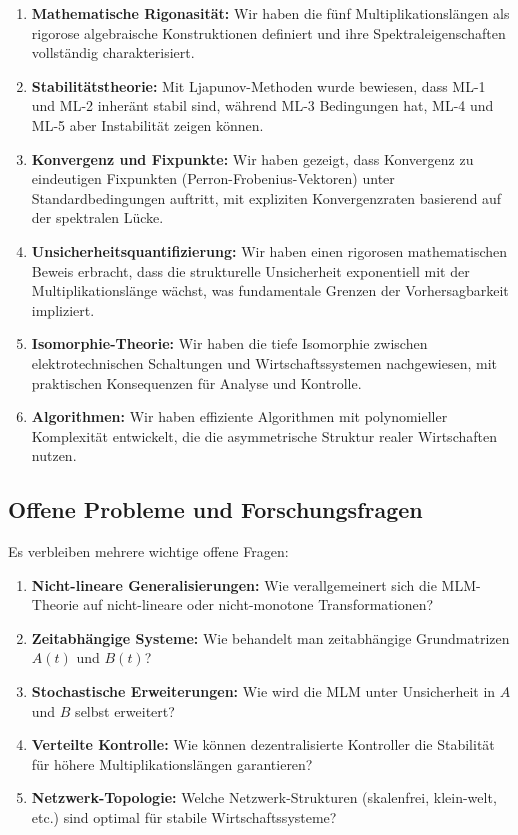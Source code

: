 \documentclass[a4paper,12pt]{article}
\theoremstyle{definition}
\begin{document}
\begin{enumerate}
\item \textbf{Mathematische Rigonasität:} Wir haben die fünf Multiplikationslängen als rigorose algebraische Konstruktionen definiert und ihre Spektraleigenschaften vollständig charakterisiert.

\item \textbf{Stabilitätstheorie:} Mit Ljapunov-Methoden wurde bewiesen, dass ML-1 und ML-2 inheränt stabil sind, während ML-3 Bedingungen hat, ML-4 und ML-5 aber Instabilität zeigen können.

\item \textbf{Konvergenz und Fixpunkte:} Wir haben gezeigt, dass Konvergenz zu eindeutigen Fixpunkten (Perron-Frobenius-Vektoren) unter Standardbedingungen auftritt, mit expliziten Konvergenzraten basierend auf der spektralen Lücke.

\item \textbf{Unsicherheitsquantifizierung:} Wir haben einen rigorosen mathematischen Beweis erbracht, dass die strukturelle Unsicherheit exponentiell mit der Multiplikationslänge wächst, was fundamentale Grenzen der Vorhersagbarkeit impliziert.

\item \textbf{Isomorphie-Theorie:} Wir haben die tiefe Isomorphie zwischen elektrotechnischen Schaltungen und Wirtschaftssystemen nachgewiesen, mit praktischen Konsequenzen für Analyse und Kontrolle.

\item \textbf{Algorithmen:} Wir haben effiziente Algorithmen mit polynomieller Komplexität entwickelt, die die asymmetrische Struktur realer Wirtschaften nutzen.
\end{enumerate}

\subsection{Offene Probleme und Forschungsfragen}

Es verbleiben mehrere wichtige offene Fragen:

\begin{enumerate}
\item \textbf{Nicht-lineare Generalisierungen:} Wie verallgemeinert sich die MLM-Theorie auf nicht-lineare oder nicht-monotone Transformationen?

\item \textbf{Zeitabhängige Systeme:} Wie behandelt man zeitabhängige Grundmatrizen $A(t)$ und $B(t)$?

\item \textbf{Stochastische Erweiterungen:} Wie wird die MLM unter Unsicherheit in $A$ und $B$ selbst erweitert?

\item \textbf{Verteilte Kontrolle:} Wie können dezentralisierte Kontroller die Stabilität für höhere Multiplikationslängen garantieren?

\item \textbf{Netzwerk-Topologie:} Welche Netzwerk-Strukturen (skalenfrei, klein-welt, etc.) sind optimal für stabile Wirtschaftssysteme?
\end{enumerate}
\end{document}
